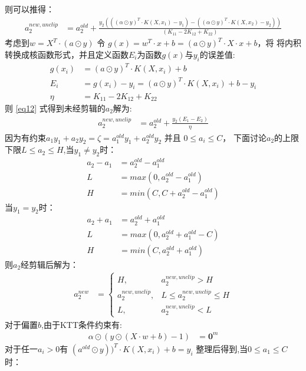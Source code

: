 \documentclass[12pt, a4paper, oneside]{ctexart}
\begin{document}
则可以推得：
\begin{align}      
    a_2^{new,unclip} &= a_2^{old} + \frac{y_2(((\alpha \odot y)^T \cdot K(X, x_1) - y_1) - ((\alpha \odot y)^T \cdot K(X, x_2)-y_2))}{(K_{11} - 2K_{12} + K_{22})} \label{eq12} 
\end{align}
考虑到$ w = X^T \cdot (a \odot y) $ 令 $ g(x) = w^T \cdot x + b = (a \odot y)^T \cdot X \cdot x + b$，将
将内积转换成核函数形式，并且定义函数$E_i$为函数$g(x)$与$y_i$的误差值:
\begin{align*}
    g(x_i) &=  (a \odot y)^T \cdot K(X, x_i) + b \\
    E_i &= g(x_i) - y_i  = (a \odot y)^T \cdot K(X, x_i) + b - y_i\\
    \eta &= K_{11} - 2K_{12} + K_{22}
\end{align*}
则 \eqref{eq12} 式得到未经剪辑的$a_2$解为:
\begin{align}      
    a_2^{new,unclip} &= a_2^{old} + \frac{y_2(E_1 - E_2)}{\eta} \label{eq13} 
\end{align}
因为有约束$a_1y_1 + a_2y_2 = \zeta = a_1^{old}y_1 + a_2^{old}y_2$ 并且 $0 \leq a_i \leq C$，
下面讨论$a_2$的上限下限$L \leq a_2 \leq H$,当$y_1 \neq y_2$时：
\begin{align*}
    a_2 - a_1 &= a_2^{old} - a_1^{old} \\
    L &= max(0, a_2^{old} - a_1^{old}) \\
    H &= min(C, C + a_2^{old} - a_1^{old})
\end{align*}
当$y_1 = y_2$时：
\begin{align*}
    a_2 + a_1 &= a_2^{old} + a_1^{old} \\
    L &= max(0, a_2^{old} + a_1^{old} - C) \\
    H &= min(C, a_2^{old} + a_1^{old})
\end{align*}
则$a_2$经剪辑后解为：
\begin{align*}
    a_2^{new} &= 
\left\{
    \begin{array}{lr}
    H, & a_2^{new,unclip} > H  \\
    a_2^{new,unclip}, & L \leq a_2^{new,unclip} \leq H\\
    L, & a_2^{new,unclip} < L  
    \end{array}
\right.
\end{align*}
对于偏置$b$,由于KTT条件约束有:
\begin{align*}
    {\alpha} \odot  (y \odot (X \cdot w + b) - 1) &= \boldsymbol{0}^m 
\end{align*}
对于任一$a_i > 0$有  $(a^{old} \odot y))^T \cdot K(X, x_i) + b = y_i $ 整理后得到,当$0 \leq a_1 \leq C$时：
\end{document}
